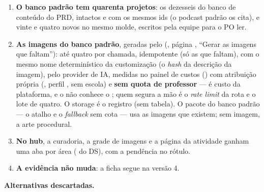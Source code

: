 \begin{enumerate}
    ou perfil de outra área é regerado sozinho. Medido com IA real: os quarenta
    numa chamada levaram 92,7\,s (a segunda tentativa estouraria o teto de
    180\,s do BFF); por área, cerca de 25\,s, e o preparo inteiro cerca de
    42\,s. A customização gera as quarenta imagens quatro por chamada.
  \item \textbf{O banco padrão tem quarenta projetos}: os dezesseis do banco de
    conteúdo do PRD, intactos e com os mesmos ids (o podcast padrão os cita),
    e vinte e quatro novos no mesmo molde, escritos pela equipe para o PO ler.
  \item \textbf{As imagens do banco padrão}, geradas pelo 
    (, página
    , \enquote{Gerar as imagens que
    faltam}): até quatro por chamada, idempotente (só as que faltam), com o
    mesmo nome determinístico da customização (o \emph{hash} da descrição da
    imagem), pelo provider de IA, medidas no painel de custos
    () com atribuição própria (,
    perfil , sem escola) e \textbf{sem quota de professor} --- é
    custo da plataforma, e o  não conhece o ; quem
    segura a mão é o \emph{rate limit} da rota e o lote de quatro. O storage é
    o registro (sem tabela). O pacote do banco padrão --- o atalho e o
    \emph{fallback} sem cota --- usa as imagens que existem; sem imagem, a arte
    procedural.
  \item \textbf{No hub}, a curadoria, a grade de imagens e a página da atividade
    ganham uma aba por área ( do DS), com a pendência no rótulo.
  \item \textbf{A evidência não muda}: a ficha segue na versão 4.
\end{enumerate}

\textbf{Alternativas descartadas.}

